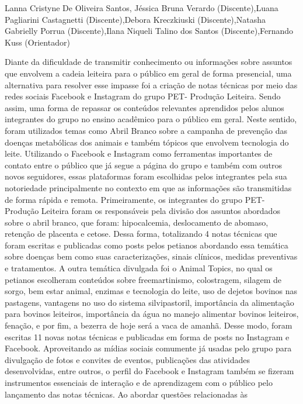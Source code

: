 Lanna Cristyne De Oliveira Santos, Jéssica Bruna Verardo (Discente),Luana Pagliarini Castagnetti (Discente),Debora Kreczkiuski (Discente),Natasha Gabrielly Porrua (Discente),Ilana Niqueli Talino dos Santos (Discente),Fernando Kuss (Orientador)

Diante da dificuldade de transmitir conhecimento ou informações sobre assuntos que 
envolvem a cadeia leiteira para o público em geral de forma presencial, uma alternativa para 
resolver esse impasse foi a criação de notas técnicas por meio das redes sociais Facebook e 
Instagram do grupo PET- Produção Leiteira. Sendo assim, uma forma de repassar os conteúdos 
relevantes aprendidos pelos alunos integrantes do grupo no ensino acadêmico para o público em 
geral. Neste sentido, foram utilizados temas como Abril Branco sobre a campanha de prevenção 
das doenças metabólicas dos animais e também tópicos que envolvem tecnologia do leite. 
Utilizando o Facebook e Instagram como ferramentas importantes de contato entre o 
público que já segue a página do grupo e também com outros novos seguidores, essas plataformas 
foram escolhidas pelos integrantes pela sua notoriedade principalmente no contexto em que as 
informações são transmitidas de forma rápida e remota. Primeiramente, os integrantes do grupo 
PET- Produção Leiteira foram os responsáveis pela divisão dos assuntos abordados sobre o abril 
branco, que foram: hipocalcemia, deslocamento de abomaso, retenção de placenta e cetose. Dessa 
forma, totalizando 4 notas técnicas que foram escritas e publicadas como posts pelos petianos 
abordando essa temática sobre doenças bem como suas caracterizações, sinais clínicos, medidas 
preventivas e tratamentos.
A outra temática divulgada foi o Animal Topics, no qual os petianos escolheram 
conteúdos sobre freemartinismo, colostragem, silagem de sorgo, bem estar animal, enzimas e 
tecnologia do leite, uso de dejetos bovinos nas pastagens, vantagens no uso do sistema silvipastoril, 
importância da alimentação para bovinos leiteiros, importância da água no manejo alimentar 
bovinos leiteiros, fenação, e por fim, a bezerra de hoje será a vaca de amanhã. Desse modo, foram 
escritas 11 novas notas técnicas e publicadas em forma de posts no Instagram e Facebook.
Aproveitando as mídias sociais comumente já usadas pelo grupo para divulgação de 
fotos e convites de eventos, publicações das atividades desenvolvidas, entre outros, o perfil do 
Facebook e Instagram também se fizeram instrumentos essenciais de interação e de aprendizagem 
com o público pelo lançamento das notas técnicas. Ao abordar questões relacionadas às 
